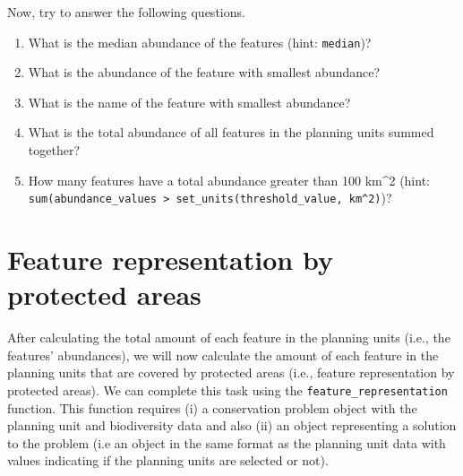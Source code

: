 \documentclass[
  12pt,
]{book}
\makeatletter
\newenvironment{Shaded}{\begin{snugshade}}{\end{snugshade}}
\newcommand{\CommentTok}[1]{\textcolor[rgb]{0.56,0.35,0.01}{\textit{#1}}}
\newcommand{\FunctionTok}[1]{\textcolor[rgb]{0.00,0.00,0.00}{#1}}
\newcommand{\NormalTok}[1]{#1}
\newcommand{\OtherTok}[1]{\textcolor[rgb]{0.56,0.35,0.01}{#1}}
\newcommand{\SpecialCharTok}[1]{\textcolor[rgb]{0.00,0.00,0.00}{#1}}
\newcommand{\StringTok}[1]{\textcolor[rgb]{0.31,0.60,0.02}{#1}}
\providecommand{\tightlist}{%
  \setlength{\itemsep}{0pt}\setlength{\parskip}{0pt}}
\newenvironment{kframe}{%
\medskip{}
\setlength{\fboxsep}{.8em}
 \def\at@end@of@kframe{}%
 \ifinner\ifhmode%
  \def\at@end@of@kframe{\end{minipage}}%
  \begin{minipage}{\columnwidth}%
 \fi\fi%
 \def\FrameCommand##1{\hskip\@totalleftmargin \hskip-\fboxsep
 \colorbox{shadecolor}{##1}\hskip-\fboxsep
     \hskip-\linewidth \hskip-\@totalleftmargin \hskip\columnwidth}%
 \MakeFramed {\advance\hsize-\width
   \@totalleftmargin\z@ \linewidth\hsize
   \@setminipage}}%
 {\par\unskip\endMakeFramed%
 \at@end@of@kframe}
\newenvironment{rmdblock}[1]
  {
  \begin{itemize}
  \renewcommand{\labelitemi}{
    \raisebox{-.7\height}[0pt][0pt]{
      {\setkeys{Gin}{width=3em,keepaspectratio}\texttt{[image: images/\#1]}}
    }
  }
  \setlength{\fboxsep}{1em}
  \begin{kframe}
  \item
  }
  {
  \end{kframe}
  \end{itemize}
  }
\newenvironment{rmdquestion}
  {\begin{rmdblock}{question}}
  {\end{rmdblock}}
\makeatother
\begin{document}
Now, try to answer the following questions.

\begin{rmdquestion}
\begin{enumerate}
\def\labelenumi{\arabic{enumi}.}
\tightlist
\item
  What is the median abundance of the features (hint: \texttt{median})?
\item
  What is the abundance of the feature with smallest abundance?
\item
  What is the name of the feature with smallest abundance?
\item
  What is the total abundance of all features in the planning units summed together?
\item
  How many features have a total abundance greater than 100 km\^{}2 (hint: \texttt{sum(abundance\_values\ \textgreater{}\ set\_units(threshold\_value,\ km\^{}2)})?
\end{enumerate}
\end{rmdquestion}

\hypertarget{feature-representation-by-protected-areas}{%
\section{Feature representation by protected areas}\label{feature-representation-by-protected-areas}}

After calculating the total amount of each feature in the planning units (i.e., the features' abundances), we will now calculate the amount of each feature in the planning units that are covered by protected areas (i.e., feature representation by protected areas). We can complete this task using the \texttt{feature\_representation} function. This function requires (i) a conservation problem object with the planning unit and biodiversity data and also (ii) an object representing a solution to the problem (i.e an object in the same format as the planning unit data with values indicating if the planning units are selected or not).

\begin{Shaded}
\end{Shaded}
\end{document}
